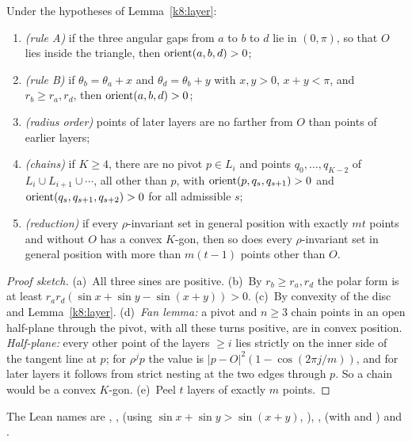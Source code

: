 \begin{lemma}\label{k8:facts}
Under the hypotheses of Lemma~\ref{k8:layer}:
\begin{enumerate}[label=(\alph*)]
\item\emph{(rule A)} if the three angular gaps from $a$ to $b$ to $d$ lie in $(0,\pi)$, so that $O$ lies inside the
triangle, then $\operatorname{orient}(a,b,d)>0$;
\item\emph{(rule B)} if $\theta_b=\theta_a+x$ and $\theta_d=\theta_b+y$ with $x,y>0$, $x+y<\pi$, and $r_b\ge
r_a,r_d$, then $\operatorname{orient}(a,b,d)>0$;
\item\emph{(radius order)} points of later layers are no farther from $O$ than points of earlier layers;
\item\emph{(chains)} if $K\ge4$, there are no pivot $p\in L_i$ and points $q_0,\dots,q_{K-2}$ of
$L_i\cup L_{i+1}\cup\cdots$, all other than $p$, with $\operatorname{orient}(p,q_s,q_{s+1})>0$ and $\operatorname{orient}(q_s,q_{s+1},q_{s+2})>0$
for all admissible $s$;
\item\emph{(reduction)} if every $\rho$-invariant set in general position with exactly $mt$ points and without $O$ has
a convex $K$-gon, then so does every $\rho$-invariant set in general position with more than $m(t-1)$ points other than
$O$.
\end{enumerate}
\end{lemma}

\begin{proof}[Proof sketch]
(a)~All three sines are positive. (b)~By $r_b\ge r_a,r_d$ the polar form is at least
$r_ar_d(\sin x+\sin y-\sin(x+y))>0$. (c)~By convexity of the disc and Lemma~\ref{k8:layer}. (d)~\emph{Fan lemma:} a
pivot and $n\ge3$ chain points in an open half-plane through the pivot, with all these turns positive, are in convex
position. \emph{Half-plane:} every other point of the layers $\ge i$ lies strictly on the inner side of the tangent line
at $p$; for $\rho^jp$ the value is $|p-O|^2(1-\cos(2\pi j/m))$, and for later layers it follows from strict nesting at
the two edges through $p$. So a chain would be a convex $K$-gon. (e)~Peel $t$ layers of exactly $m$ points.
\end{proof}

The Lean names are , ,  (using
$\sin x+\sin y>\sin(x+y)$, ), ,  (with
 and ) and .

